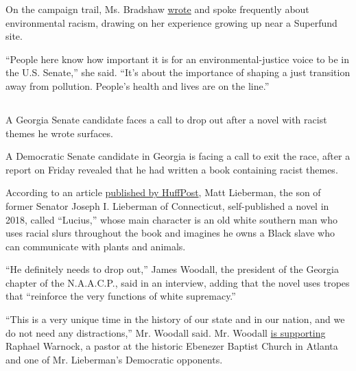 On the campaign trail, Ms. Bradshaw
\href{https://www.sierraclub.org/tennessee/blog/2020/06/marquita-bradshaw-let-s-hold-space-dissonance}{wrote}
and spoke frequently about environmental racism, drawing on her
experience growing up near a Superfund site.

``People here know how important it is for an environmental-justice
voice to be in the U.S. Senate,'' she said. ``It's about the importance
of shaping a just transition away from pollution. People's health and
lives are on the line.''

\hypertarget{section-9}{%
\subsection{}\label{section-9}}

A Georgia Senate candidate faces a call to drop out after a novel with
racist themes he wrote surfaces.

A Democratic Senate candidate in Georgia is facing a call to exit the
race, after a report on Friday revealed that he had written a book
containing racist themes.

According to an article
\href{https://www.huffpost.com/entry/a-democratic-senate-candidate-wrote-a-book-filled-with-racist-tropes_n_5f2cd06ac5b6e96a22b03e3e?vdc\&guccounter=1\&guce_referrer=aHR0cHM6Ly90LmNvL0ZTY05URktDYXY_YW1wPTE\&guce_referrer_sig=AQAAAN25FsV52VhOSPdANYrQDwIapNplzxvmOd--teHPmFUOu7EEDyFD4NTVwuz8CgNoXgZQhaN7985GL5cKg9GZfEHg_-pjGzl-s6ne39c9Xe5i5pZGUAbHhvlNQ3HB2n_4UEK8EoUYMUplUl5CeeSL2cXLuEM0LvYLpwwFd2r2A5sy}{published
by HuffPost}, Matt Lieberman, the son of former Senator Joseph I.
Lieberman of Connecticut, self-published a novel in 2018, called
``Lucius,'' whose main character is an old white southern man who uses
racial slurs throughout the book and imagines he owns a Black slave who
can communicate with plants and animals.

``He definitely needs to drop out,'' James Woodall, the president of the
Georgia chapter of the N.A.A.C.P., said in an interview, adding that the
novel uses tropes that ``reinforce the very functions of white
supremacy.''

``This is a very unique time in the history of our state and in our
nation, and we do not need any distractions,'' Mr. Woodall said. Mr.
Woodall
\href{https://twitter.com/iMajorWish/status/1235969589147840513}{is
supporting} Raphael Warnock, a pastor at the historic Ebenezer Baptist
Church in Atlanta and one of Mr. Lieberman's Democratic opponents.

